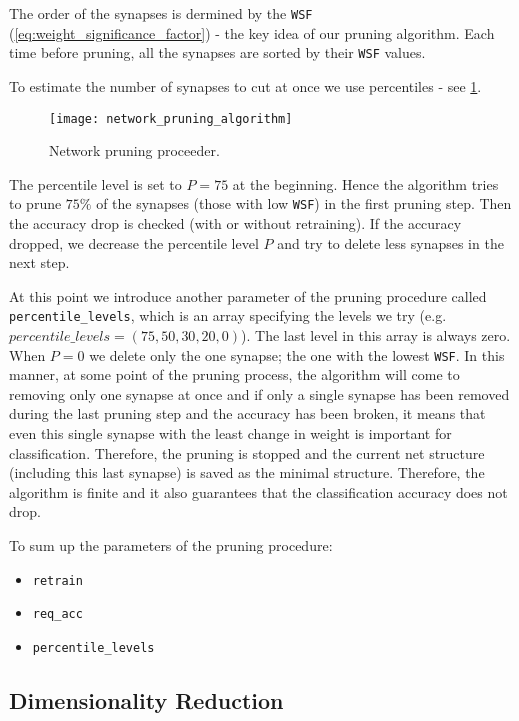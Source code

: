 The order of the synapses is dermined by the \texttt{WSF} (\cref{eq:weight_significance_factor}) - the key idea of our pruning algorithm. Each time before pruning, all the synapses are sorted by their \texttt{WSF} values.

To estimate the number of synapses to cut at once we use percentiles - see \cref{fig:methods:network_pruning_proceeder}.

\begin{figure}[H]
  \centering
  \texttt{[image: network\_pruning\_algorithm]}
  \caption{Network pruning proceeder.}
  \label{fig:methods:network_pruning_proceeder}
\end{figure}

The percentile level is set to $ P = 75 $ at the beginning. Hence the algorithm tries to prune $ 75\% $ of the synapses (those with low \texttt{WSF}) in the first pruning step. Then the accuracy drop is checked (with or without retraining). If the accuracy dropped, we decrease the percentile level $ P $ and try to delete less synapses in the next step.

At this point we introduce another parameter of the pruning procedure called \texttt{percentile\_levels}, which is an array specifying the levels we try (e.g.  $percentile\_levels = (75, 50, 30, 20, 0) $). The last level in this array is always zero. When $ P = 0 $ we delete only the one synapse; the one with the lowest \texttt{WSF}. In this manner, at some point of the pruning process, the algorithm will come to removing only one synapse at once and if only a single synapse has been removed during the last pruning step and the accuracy has been broken, it means that even this single synapse with the least change in weight is important for classification. Therefore, the pruning is stopped and the current net structure (including this last synapse) is saved as the minimal structure. Therefore, the algorithm is finite and it also guarantees that the classification accuracy does not drop.

To sum up the parameters of the pruning procedure:

\begin{itemize}
\item \texttt{retrain}
\item \texttt{req\_acc}
\item \texttt{percentile\_levels}
\end{itemize}

\subsection*{Dimensionality Reduction}



